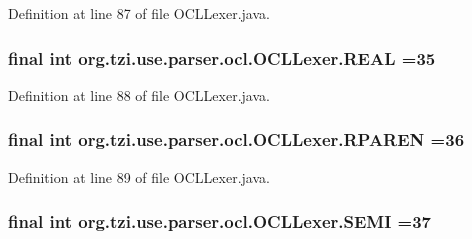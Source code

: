 Definition at line 87 of file O\-C\-L\-Lexer.\-java.

\hypertarget{classorg_1_1tzi_1_1use_1_1parser_1_1ocl_1_1_o_c_l_lexer_abab203d7e5ca0943454e5c26ca7ba1ab}{
\subsubsection[{R\-E\-A\-L}]{\setlength{\rightskip}{0pt plus 5cm}final int org.\-tzi.\-use.\-parser.\-ocl.\-O\-C\-L\-Lexer.\-R\-E\-A\-L =35\hspace{0.3cm}{\ttfamily [static]}}}\label{classorg_1_1tzi_1_1use_1_1parser_1_1ocl_1_1_o_c_l_lexer_abab203d7e5ca0943454e5c26ca7ba1ab}


Definition at line 88 of file O\-C\-L\-Lexer.\-java.

\hypertarget{classorg_1_1tzi_1_1use_1_1parser_1_1ocl_1_1_o_c_l_lexer_a79846de5a5eb3b0c342a9e73deaa56b6}{
\subsubsection[{R\-P\-A\-R\-E\-N}]{\setlength{\rightskip}{0pt plus 5cm}final int org.\-tzi.\-use.\-parser.\-ocl.\-O\-C\-L\-Lexer.\-R\-P\-A\-R\-E\-N =36\hspace{0.3cm}{\ttfamily [static]}}}\label{classorg_1_1tzi_1_1use_1_1parser_1_1ocl_1_1_o_c_l_lexer_a79846de5a5eb3b0c342a9e73deaa56b6}


Definition at line 89 of file O\-C\-L\-Lexer.\-java.

\hypertarget{classorg_1_1tzi_1_1use_1_1parser_1_1ocl_1_1_o_c_l_lexer_a3d91bc60e06bf451be866987176d600e}{
\subsubsection[{S\-E\-M\-I}]{\setlength{\rightskip}{0pt plus 5cm}final int org.\-tzi.\-use.\-parser.\-ocl.\-O\-C\-L\-Lexer.\-S\-E\-M\-I =37\hspace{0.3cm}{\ttfamily [static]}}}\label{classorg_1_1tzi_1_1use_1_1parser_1_1ocl_1_1_o_c_l_lexer_a3d91bc60e06bf451be866987176d600e}


